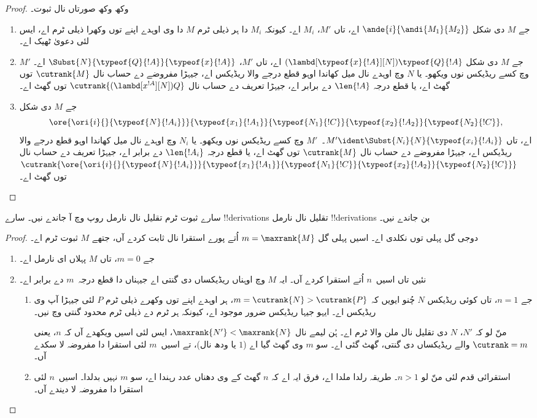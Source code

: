\documentclass[../../../include/open-logic-section]{subfiles}
\begin{document}
\begin{proof}
  وکھ وکھ صورتاں نال ثبوت۔
  \begin{enumerate}
  \item جے $M$ دی شکل $\ande{i}{\andi{M_1}{M_2}}$ اے، تاں $M'$، $M_i$ اے۔ کیونکہ $M_i$ دا ہر ذیلی ٹرم $M$ دا وی اوہدے اپنے توں وکھرا ذیلی ٹرم اے، ایس لئی دعویٰ ٹھیک اے۔
  \item جے $M$ دی شکل $(\lambd[\typeof{x}{!A}][N])\typeof{Q}{!A}$ اے، تاں $M'$، $\Subst{N}{\typeof{Q}{!A}}{\typeof{x}{!A}}$ اے۔ $M'$ وچ کسے ریڈیکس نوں ویکھو۔ یا $N$ وچ اوہدے نال میل کھاندا اوہو قطع درجے والا ریڈیکس اے، جیہڑا مفروضے دے حساب نال $\cutrank{M}$ توں گھٹ اے، یا قطع درجہ $\len{!A}$ دے برابر اے، جیہڑا تعریف دے حساب نال $\cutrank{(\lambd[x^{!A}][N])Q}$ توں گھٹ اے۔
  \item جے $M$ دی شکل
    \[
    \ore{\ori{i}{}{\typeof{N}{!A_i}}}
        {\typeof{x_1}{!A_1}}{\typeof{N_1}{!C}}
        {\typeof{x_2}{!A_2}}{\typeof{N_2}{!C}},
    \]
    اے، تاں $M' \ident \Subst{N_i}{N}{\typeof{x_i}{!A_i}}$۔~$M'$ وچ کسے ریڈیکس نوں ویکھو۔ یا $N_i$ وچ اوہدے نال میل کھاندا اوہو قطع درجے والا ریڈیکس اے، جیہڑا مفروضے دے حساب نال $\cutrank{M}$ توں گھٹ اے، یا قطع درجہ $\len{!A_i}$ دے برابر اے، جیہڑا تعریف دے حساب نال $\cutrank{\ore{\ori{i}{}{\typeof{N}{!A_i}}}
      {\typeof{x_1}{!A_1}}{\typeof{N_1}{!C}}
      {\typeof{x_2}{!A_2}}{\typeof{N_2}{!C}}}$ توں گھٹ اے۔
  \end{enumerate}
\end{proof}

\begin{thm}
  سارے ثبوت ٹرم تقلیل نال نارمل روپ وچ آ جاندے نیں۔ سارے !!{derivation}s تقلیل نال نارمل !!{derivation}s بن جاندے نیں۔
\end{thm}

\begin{proof}
  دوجی گل پہلی توں نکلدی اے۔ اسیں پہلی گل $m=\maxrank{M}$ اُتے پورے استقرا نال ثابت کردے آں، جتھے $M$ ثبوت ٹرم اے۔
  \begin{enumerate}

  \item جے $m=0$، تاں $M$ پہلاں ای نارمل اے۔
  \item نئیں تاں اسیں~$n$ اُتے استقرا کردے آں۔ ایہ $M$ وچ اوہناں ریڈیکساں دی گنتی اے جیہناں دا قطع درجہ~$m$ دے برابر اے۔
    \begin{enumerate}
    \item جے $n=1$، تاں کوئی ریڈیکس $N$ چُنو ایویں کہ $m = \cutrank{N} >
      \cutrank{P}$، ہر اوہدے اپنے توں وکھرے ذیلی ٹرم $P$ لئی جیہڑا آپ وی ریڈیکس اے۔ ایہو جیہا ریڈیکس ضرور موجود اے، کیونکہ ہر ٹرم دے ذیلی ٹرم محدود گنتی وچ نیں۔

      منّ لو کہ $N'$، $N$ دی تقلیل نال ملن والا ٹرم اے۔ ہُن لیمے نال $\maxrank{N'} < \maxrank{N}$، ایس لئی اسیں ویکھدے آں کہ $n$، یعنی $\cutrank=m$ والے ریڈیکساں دی گنتی، گھٹ گئی اے۔ سو $m$ وی گھٹ گیا اے ($1$ یا ودھ نال)، تے اسیں~$m$ لئی استقرا دا مفروضہ لا سکدے آں۔
    \item استقرائی قدم لئی منّ لو $n>1$۔ طریقہ رلدا ملدا اے، فرق ایہ اے کہ $n$ گھٹ کے وی دھناں عدد رہندا اے، سو $m$ نہیں بدلدا۔ اسیں~$n$ لئی استقرا دا مفروضہ لا دیندے آں۔
    \end{enumerate}
\end{enumerate}
\end{proof}
\end{document}
